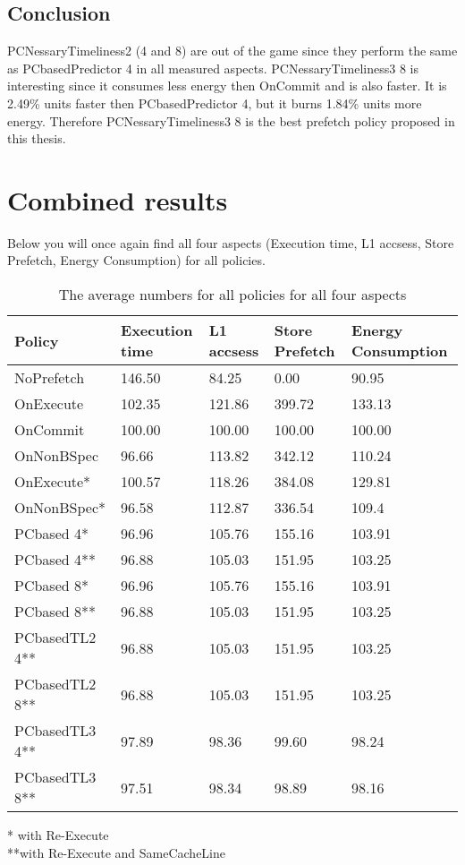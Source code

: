\subsection{Conclusion}
PCNessaryTimeliness2 (4 and 8) are out of the game since they perform the same as PCbasedPredictor 4 in all measured aspects. PCNessaryTimeliness3 8 is interesting since it consumes less energy then OnCommit and is also faster. It is 2.49\% units
faster then PCbasedPredictor 4, but it burns 1.84\% units more energy. Therefore
PCNessaryTimeliness3 8 is the best prefetch policy proposed in this thesis.

\section{Combined results}
Below you will once again find all four aspects (Execution time, L1 accsess, Store Prefetch, Energy Consumption) for all policies.
    \begin{table}[H]
\centering

\begin{tabular}{ |l||l|l|l|l| }
\hline
Policy&Execution time & L1 accsess & Store Prefetch & Energy Consumption  \\  \hline \hline
NoPrefetch & 146.50 & 84.25 & 0.00 & 90.95 \\ \hline
OnExecute & 102.35 & 121.86 & 399.72 & 133.13 \\ \hline
OnCommit & 100.00 & 100.00 & 100.00 & 100.00 \\ \hline
OnNonBSpec & 96.66 & 113.82 & 342.12 & 110.24 \\ \hline
OnExecute* & 100.57 & 118.26 & 384.08 & 129.81 \\ \hline
OnNonBSpec* & 96.58 & 112.87 & 336.54 & 109.4 \\ \hline
PCbased 4* & 96.96 & 105.76 & 155.16 & 103.91 \\ \hline
PCbased 4** & 96.88 & 105.03 & 151.95 & 103.25 \\ \hline
PCbased 8* & 96.96 & 105.76 & 155.16 & 103.91 \\ \hline
PCbased 8** & 96.88 & 105.03 & 151.95 & 103.25 \\ \hline
PCbasedTL2 4** & 96.88 & 105.03 & 151.95 & 103.25 \\ \hline
PCbasedTL2 8** & 96.88 & 105.03 & 151.95 & 103.25 \\ \hline
PCbasedTL3 4** & 97.89 & 98.36 & 99.60 & 98.24 \\ \hline
PCbasedTL3 8** & 97.51 & 98.34 & 98.89 & 98.16\\ \hline
 \end{tabular}
 * with Re-Execute \\
**with Re-Execute and SameCacheLine
\caption{The average numbers for all policies for all four aspects}
\label{Com}
\end{table}
